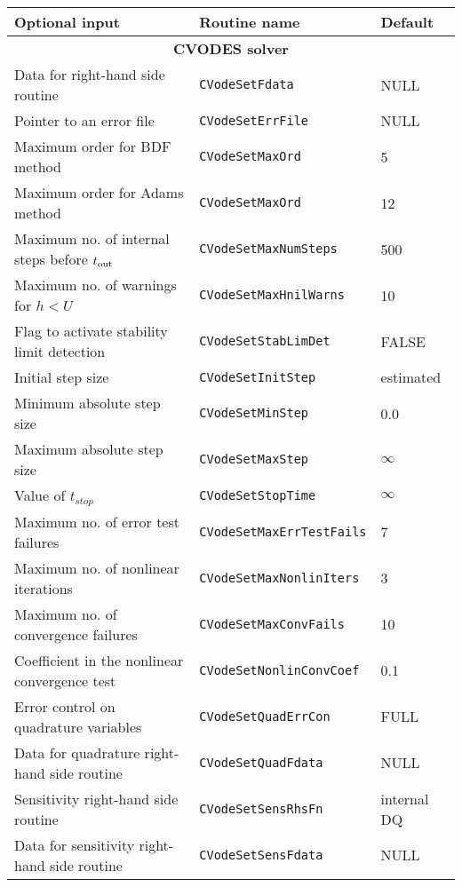 %
%
\begin{acmtable}{\textwidth}
\centering
\begin{tabularx}{\textwidth}{lll}
{\bf Optional input} & {\bf Routine name} & {\bf Default} \\
\hline
\multicolumn{3}{c}{\bf CVODES solver} \\
\hline
Data for right-hand side routine & {\tt CVodeSetFdata} & NULL \\
Pointer to an error file & {\tt CVodeSetErrFile} & NULL  \\
Maximum order for BDF method & {\tt CVodeSetMaxOrd} & 5 \\
Maximum order for Adams method & {\tt CVodeSetMaxOrd} & 12  \\
Maximum no. of internal steps before $t_{\mbox{\scriptsize out}}$ & {\tt CVodeSetMaxNumSteps} & 500 \\
Maximum no. of warnings for $h < U$ & {\tt CVodeSetMaxHnilWarns} & 10 \\
Flag to activate stability limit detection & {\tt CVodeSetStabLimDet} & FALSE \\
Initial step size & {\tt CVodeSetInitStep} & estimated \\
Minimum absolute step size & {\tt CVodeSetMinStep} & 0.0 \\
Maximum absolute step size & {\tt CVodeSetMaxStep} & $\infty$ \\
Value of $t_{stop}$ & {\tt CVodeSetStopTime} & $\infty$ \\
Maximum no. of error test failures & {\tt CVodeSetMaxErrTestFails} & 7 \\
Maximum no. of nonlinear iterations & {\tt CVodeSetMaxNonlinIters} & 3 \\
Maximum no. of convergence failures & {\tt CVodeSetMaxConvFails} & 10 \\
Coefficient in the nonlinear convergence test & {\tt CVodeSetNonlinConvCoef} & 0.1 \\
Error control on quadrature variables & {\tt CVodeSetQuadErrCon} & FULL \\
Data for quadrature right-hand side routine & {\tt CVodeSetQuadFdata} & NULL\\
Sensitivity right-hand side routine & {\tt CVodeSetSensRhsFn}  & internal DQ  \\
Data for sensitivity right-hand side routine & {\tt CVodeSetSensFdata} & NULL \\

\end{tabularx}
\end{acmtable}
